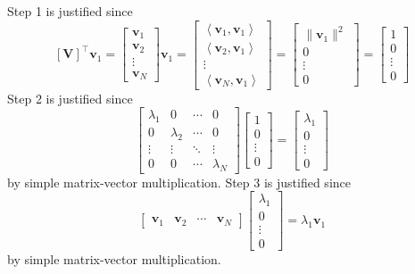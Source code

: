 \documentclass[]{article}
\newcommand{\iprod}[2]{\left\langle #1, #2 \right\rangle}
\newcommand{\tpose}[1]{\left[#1\right]^{\! \top} \!\!}
\begin{document}
Step 1 is justified since
\begin{equation}
	\tpose{\bm{V}} \bm{v}_1 = \begin{bmatrix}
	\bm{v}_1 \\
	\bm{v}_2 \\
	\vdots \\
	\bm{v}_N
	\end{bmatrix} \bm{v}_1 = 
	\begin{bmatrix}
	\iprod{\bm{v}_1}{\bm{v}_1} \\
	\iprod{\bm{v}_2}{\bm{v}_1} \\
	\vdots \\
	\iprod{\bm{v}_N}{\bm{v}_1}
	\end{bmatrix} = 
	\begin{bmatrix}
	\|\bm{v}_1\|^2 \\
	0 \\
	\vdots \\
	0
	\end{bmatrix} = 
	\begin{bmatrix}
	1 \\
	0 \\
	\vdots \\
	0
	\end{bmatrix}
\end{equation}
Step 2 is justified since 
\begin{equation}
	\begin{bmatrix}
	\lambda_1 & 0 & \cdots & 0 \\
	0 & \lambda_2 & \cdots & 0 \\
	\vdots & \vdots & \ddots & \vdots \\
	0 & 0 & \cdots & \lambda_N
	\end{bmatrix}
	\begin{bmatrix}
	1 \\
	0 \\
	\vdots \\
	0
	\end{bmatrix} = 
	\begin{bmatrix}
	\lambda_1 \\
	0 \\
	\vdots \\
	0
	\end{bmatrix}
\end{equation}
by simple matrix-vector multiplication. 
Step 3 is justified since
\begin{equation}
	\begin{bmatrix}
	\bm{v}_1 & \bm{v}_2 & \cdots & \bm{v}_N
	\end{bmatrix}
	\begin{bmatrix}
	\lambda_1 \\
	0 \\
	\vdots \\
	0
	\end{bmatrix} = 
	\lambda_1 \bm{v}_1
\end{equation}
by simple matrix-vector multiplication. 
\end{document}
